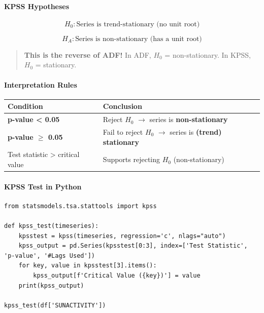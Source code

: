 \documentclass[12pt,openany]{book}
\begin{document}
\paragraph{KPSS Hypotheses}

\begin{equation*}
    H_0: \text{Series is trend-stationary (no unit root)}
\end{equation*}

\begin{equation*}
    H_A: \text{Series is non-stationary (has a unit root)}
\end{equation*}

\begin{quote}
\textbf{This is the reverse of ADF!} In ADF, \(H_0\) = non-stationary. In KPSS, \(H_0\) = stationary.\par

\end{quote}

\paragraph{Interpretation Rules}

\begin{center}
\begin{tabular}{|L{0.28\textwidth}|L{0.62\textwidth}|}
\hline
Condition & Conclusion \\
\hline
\textbf{p-value < 0.05} & Reject \(H_0\) \(\rightarrow\) series is \textbf{non-stationary} \\
\hline
\textbf{p-value \(\geq\) 0.05} & Fail to reject \(H_0\) \(\rightarrow\) series is \textbf{(trend) stationary} \\
\hline
Test statistic > critical value & Supports rejecting \(H_0\) (non-stationary) \\
\hline
\end{tabular}
\end{center}

\paragraph{KPSS Test in Python}

\begin{Verbatim}[breaklines=true,breakanywhere=true,fontsize=\small]
from statsmodels.tsa.stattools import kpss

def kpss_test(timeseries):
    kpsstest = kpss(timeseries, regression='c', nlags="auto")
    kpss_output = pd.Series(kpsstest[0:3], index=['Test Statistic', 'p-value', '#Lags Used'])
    for key, value in kpsstest[3].items():
        kpss_output[f'Critical Value ({key})'] = value
    print(kpss_output)

kpss_test(df['SUNACTIVITY'])
\end{Verbatim}
\end{document}
